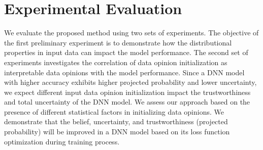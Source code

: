 \section{Experimental Evaluation}
\label{exp}

We evaluate the proposed method using two sets of experiments. The objective of the first preliminary experiment is to demonstrate how the distributional properties in input data can impact the model performance. 
The second set of experiments investigates the correlation of data opinion initialization as interpretable data opinions with the model performance. Since a DNN model with higher accuracy exhibits higher projected probability and lower uncertainty, we expect different input data opinion initialization impact the trustworthiness and total uncertainty of the DNN model. We assess our approach based on the presence of different statistical factors in initializing data opinions.
We demonstrate that the belief, uncertainty, and trustworthiness (projected probability) will be improved in a DNN model based on its loss function optimization during training process. 



